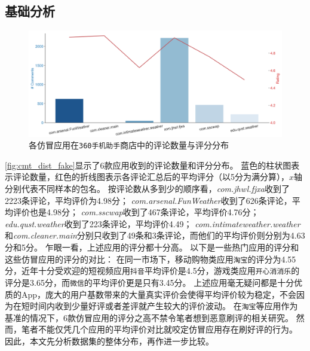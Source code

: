 \subsection{基础分析}

%
%
%

\begin{figure}[htbp]
	\centering
	\includegraphics[width=\textwidth]{./Figures/edwin-cmt-ratings-dist-3.png}
    \caption{各仿冒应用在\texttt{360手机助手}商店中的评论数量与评分分布}
    \label{fig:cmt_dist_fake}
\end{figure}

\autoref{fig:cmt_dist_fake}显示了6款应用收到的评论数量和评分分布。
蓝色的柱状图表示评论数量，红色的折线图表示各评论汇总后的平均评分（以5分为满分算），$x$轴分别代表不同样本的包名。
按评论数从多到少的顺序看，\emph{com.jhwl.fjxa}收到了2223条评论，平均评价为4.98分；
\emph{com.arsenal.FunWeather}收到了626条评论，平均评价也是4.98分；
\emph{com.sscwap}收到了467条评论，平均评价4.76分；
\emph{edu.qust.weather}收到了223条评论，平均评价4.49；
\emph{com.intimateweather.weather}和\emph{com.cleaner.main}分别只收到了49条和3条评论，而他们的平均评价则分别为4.63分和5分。
乍眼一看，上述应用的评分都十分高。
以下是一些热门应用的评分和这些仿冒应用的评分的对比：
在同一市场下，移动购物类应用\texttt{淘宝}的评分为4.55分，近年十分受欢迎的短视频应用\texttt{抖音}平均评价是4.5分，游戏类应用\texttt{开心消消乐}的评分是3.65分，而\texttt{微信}的平均评价更是只有3.45分。
上述应用毫无疑问都是十分优质的App，庞大的用户基数带来的大量真实评价会使得平均评价较为稳定，不会因为在短时间内收到少量好评或者差评就产生较大的评价波动。
在\texttt{淘宝}等应用作为基准的情况下，6款仿冒应用的评分之高不禁令笔者想到恶意刷评的相关研究。
然而，笔者不能仅凭几个应用的平均评价对比就咬定仿冒应用存在刷好评的行为。
因此，本文先分析数据集的整体分布，再作进一步比较。

